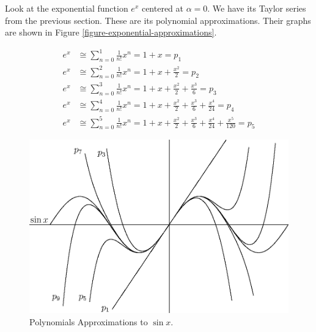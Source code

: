 \documentclass[fleqn]{report}
\begin{document}
\begin{example}
Look at the exponential function $e^x$ centered at $\alpha =
0$. We have its Taylor series from the previous section. These
are its polynomial approximations. Their graphs are shown in
Figure \ref{figure-exponential-approximations}.

\begin{align*}
e^x & \cong \sum_{n=0}^1 \frac{1}{n!} x^n = 1 + x = p_1 \\
e^x & \cong \sum_{n=0}^2 \frac{1}{n!} x^n = 1 + x +
\frac{x^2}{2} = p_2 \\
e^x & \cong \sum_{n=0}^3 \frac{1}{n!} x^n = 1 + x +
\frac{x^2}{2} + \frac{x^3}{6} = p_3 \\
e^x & \cong \sum_{n=0}^4 \frac{1}{n!} x^n = 1 + x +
\frac{x^2}{2} + \frac{x^3}{6} + \frac{x^4}{24} = p_4 \\
e^x & \cong \sum_{n=0}^5 \frac{1}{n!} x^n = 1 + x +
\frac{x^2}{2} + \frac{x^3}{6} + \frac{x^4}{24} +
\frac{x^5}{120} = p_5
\end{align*}
\end{example}

\begin{figure}[t]
\centering
\includegraphics[width=12cm]{figure29.eps}
\caption{Polynomials Approximations to $\sin x$.}
\label{figure-sine-approximations}
\end{figure}
\end{document}
